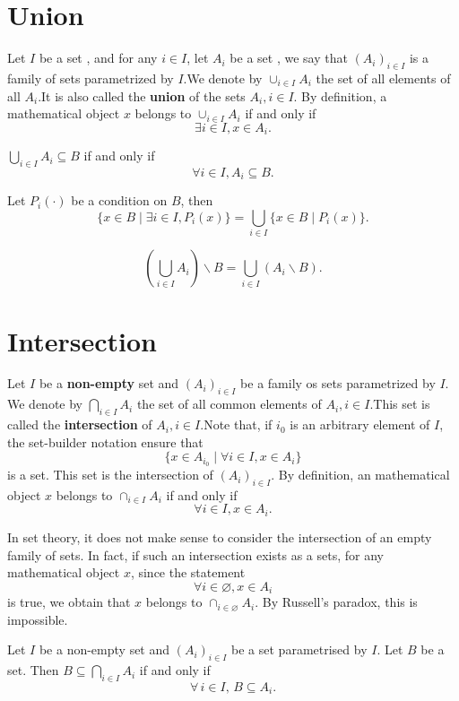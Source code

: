 \section{Union}
\begin{definitionenv}
    Let $I$ be a set , and for any $i \in I$,  let $A_i$ be a set , we say that $(A_i)_{i\in I}$ is a family of sets parametrized by $I$.We denote by $\cup_{i \in I}A_i$ the set of all elements of all $A_i$.It is also called the \textbf{union} of the sets $A_i, i\in I$. By definition, a mathematical object $x$ belongs to $\cup_{i \in I}A_i$ if and only if $$\exists i\in I, x\in A_i.$$ 
\end{definitionenv}
\begin{propositionenv}
    $ \displaystyle \bigcup_{i\in I}A_i\subseteq B$ if and only if $$\forall i\in I, A_i\subseteq B.$$
\end{propositionenv}
\begin{corollaryenv}\label{corollary2.6.1}
    Let $P_i(\cdot) $ be a condition on $B$, then
    $$\{x\in B\mid\exists i\in I, P_i(x)\}=\bigcup_{i\in I}\{x\in B\mid P_i(x)\}.$$
\end{corollaryenv}
\begin{propositionenv}
    $$\left( \bigcup _{i\in I}A_i\right)\backslash B=\bigcup_{i\in I}\left( A_i\backslash B\right).$$
\end{propositionenv}
\section{Intersection}
\begin{definitionenv}
    Let $I$ be a \textbf{non-empty} set and $(A_i)_{i\in I} $ be a family os sets parametrized by $I$. We denote by $\displaystyle \bigcap_{i\in I}A_i $ the set of all common elements of $A_i, i\in I$.This set is called the \textbf{intersection} of $A_i, i\in I$.Note that, if $i_0$ is an arbitrary element of $I$, the set-builder notation ensure that
    $$\{x\in A_{i_0}\mid \forall i\in I, x\in A_i\}$$ is a set. This set is the intersection of $(A_i)_{i\in I}$.
    \newline
    By definition,  an mathematical object $x$ belongs to $\cap _{i\in I}A_i$ if and only if $$\forall i\in I , x\in A_i.$$
    
\end{definitionenv}
\begin{remark}
    In set theory,  it does not make sense to consider the intersection of an empty family of sets. In fact,  if such an intersection exists as a sets, for any mathematical object $x$,  since the statement $$\forall i\in \varnothing, x \in A_i$$is true,  we obtain that $x$ belongs to $\cap_{i\in \varnothing}A_i$. By Russell's paradox,  this is impossible.
\end{remark}
\begin{propositionenv}\label{proposition2.7.1}
Let \( I \) be a non-empty set and \( (A_i)_{i \in I} \) be a set parametrised by \( I \). Let \( B \) be a set. Then \( B \subseteq \bigcap_{i \in I} A_i \) if and only if
\[
\forall\,  i \in I, \,  B \subseteq A_i.
\]
\end{propositionenv}


